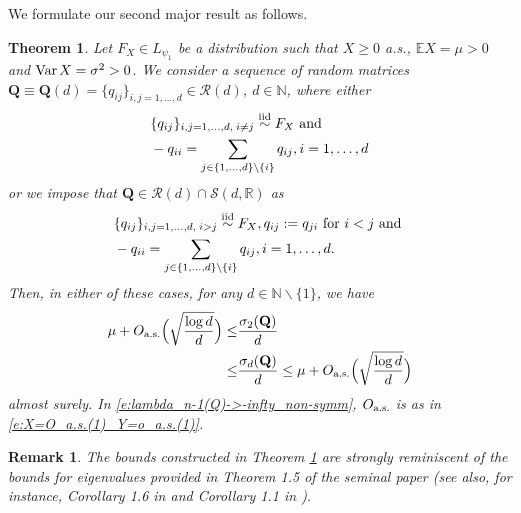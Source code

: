 \documentclass[9pt,twocolumn,twoside]{pnas-new}
\makeatletter
\newcommand{\bbN}{{\mathbb N}}
\newcommand{\bbE}{{\mathbb E}}
\newcommand{\Var}{\textnormal{Var\hspace{0.5mm}}}
\newcommand{\?}{\textbf{?}}
\newcommand{\as}{\textnormal{a.s.}}
\newcommand{\QQ}{\mathbf{Q}}
\newcommand{\RR}{\mathbb{R}}
\newtheorem{@remark}{\bf Remark}
\newenvironment{remark}{\begin{@remark}\rm}{\end{@remark}}
\newtheorem{theorem}{\bf Theorem}
\makeatother
\begin{document}
We formulate our second major result as follows. 
\begin{theorem}\label{t:lambda_n-1(Q)->-infty_non-symm_a.s.}
  Let $F_X \in L_{\psi_1}$ be a distribution such that $X \geq 0$
  a.s., $\bbE X = \mu > 0$ and $\Var X = \sigma^2 > 0$. We consider a
  sequence of random matrices
  $\QQ \equiv \QQ(d) = \{q_{ij}\}_{i,j=1,\hdots,d} \in \mathcal{R}(d)$, $d \in \bbN$,
  where either
  \begin{align}\label{e:RM_theorem_general_condition}
    \begin{aligned}
  &\{q_{ij}\}_{i , j =1, \hdots, d, \hspace{0.75mm}i \neq j}
    \stackrel{\textnormal{iid}}\sim F_X
    \text{ and }\\
  &- q_{ii} = \sum_{j \in \{1,\hdots,d\} \backslash \{i\}}q_{ij},
  i=1,\hdots,d
  \end{aligned}
  \end{align}
  or we impose that $\QQ \in \mathcal{R}(d) \cap \mathcal{S}(d, \RR)$ as 
    \begin{align}
    \begin{aligned}\label{e:RM_theorem_symmetry_condition}
  &\{q_{ij}\}_{i , j =1, \hdots, d, \hspace{0.75mm}i > j}
  \stackrel{\textnormal{iid}}\sim F_X,
  q_{ij} := q_{ji} \text{ for } i < j
    \text{ and }\\
  &- q_{ii} = \sum_{j \in \{1,\hdots,d\} \backslash \{i\}}q_{ij},
  i=1,\hdots,d.
  \end{aligned}
\end{align}
    Then, in either of these cases, for any $d \in \bbN \backslash\{1\}$, we have
    \begin{align}
 \mu+ O_{\as}\Big(\sqrt{ \frac{\log d}{d}}\Big) \leq& \frac{\sigma_2(\QQ)}{d} 
 \notag \\
 \leq& \frac{\sigma_d(\QQ)}{d}
 \leq \mu+ O_{\as}\Big(\sqrt{ \frac{\log d}{d}}\Big)
 \label{e:lambda_n-1(Q)->-infty_non-symm}
      \end{align}
      almost surely. In \eqref{e:lambda_n-1(Q)->-infty_non-symm},
      $O_{\textnormal{a.s.}}$ is as in
      \eqref{e:X=O_a.s.(1)_Y=o_a.s.(1)}.
\end{theorem}

\begin{remark}
  The bounds constructed in Theorem
  \ref{t:lambda_n-1(Q)->-infty_non-symm_a.s.} are strongly reminiscent
  of the bounds for eigenvalues provided in Theorem 1.5 of the seminal
  paper \cite{bordenave:caputo:chafai:2014} (see also, for instance,
  Corollary 1.6 in \cite{bryc:dembo:jiang:2006} and Corollary 1.1 in
  \cite{ding:jiang:2010}).
\end{remark}
\end{document}
